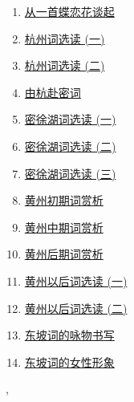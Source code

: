 \documentclass[11pt]{article}
\renewcommand{\today}{\shortmonthname[\the\month] \the \day,  \the\year}
\begin{document}
\begin{multicols}{2}
	\begin{enumerate}
		\item \href{https://mp.weixin.qq.com/s/OhdLDOGCtV3YBzGOiBuyLw}{从一首蝶恋花谈起}	%
		\item \href{https://mp.weixin.qq.com/s/8ptPG-jVx4ion3GJaMhX0A}{杭州词选读 (一)}	%
		\item \href{https://mp.weixin.qq.com/s/f_pUtRRQda3ftECNZS3RQQ}{杭州词选读 (二)}	%
		\item \href{https://mp.weixin.qq.com/s/MCxaIUB_ZmrWDsqTMkZGug}{由杭赴密词}	%
		\item \href{https://mp.weixin.qq.com/s/9TdNbvKjg4gqw8czoFFgXQ}{密徐湖词选读 (一)}	%
		\item \href{https://mp.weixin.qq.com/s/r2yISPnsQZnxSkhTUS9xiw}{密徐湖词选读 (二)}	%
		\item \href{https://mp.weixin.qq.com/s/3CHok9KmE6zg4KmdmDEnAQ}{密徐湖词选读 (三)}	%
		\item \href{https://mp.weixin.qq.com/s/F8CeGyaoaBZoCQED-Uqs4A}{黄州初期词赏析}	%
		\item \href{https://mp.weixin.qq.com/s/s2Kd8XruViCBqUTFldn_rw}{黄州中期词赏析}	%
		\item \href{https://mp.weixin.qq.com/s/nce1jKeD8ZEjWiWbl7WE3w}{黄州后期词赏析}	%
		\item \href{https://mp.weixin.qq.com/s/dmgIUDVUMVP-Ue8XioCptQ}{黄州以后词选读 (一)}	%
		\item \href{https://mp.weixin.qq.com/s/zzwiKI4fGgFsidKf1czIxw}{黄州以后词选读 (二)}	%
		\item \href{https://mp.weixin.qq.com/s/kkmO97y7_1gbcsxnQQfuWQ}{东坡词的咏物书写}	%
		\item \href{https://mp.weixin.qq.com/s/QOHllI6xqhKPGdTpIAWz7w}{东坡词的女性形象}	%
	\end{enumerate}
\end{multicols}






%
\begin{flushright}
	\tiny \today 
\end{flushright}
\end{document}

